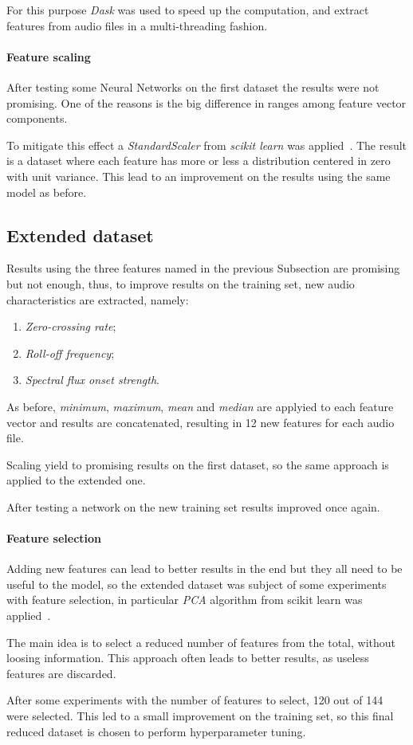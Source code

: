 For this purpose \emph{Dask} was used to speed up the computation, and 
extract features from audio files in a multi-threading fashion.~\cite{dask}

\paragraph{Feature scaling}
After testing some Neural Networks on the first dataset the results 
were not promising. One of the reasons is the big difference in 
ranges among feature vector components.

To mitigate this effect a \emph{StandardScaler} from \emph{scikit learn} was applied~\cite{scaler}.
The result is a dataset where each feature has more or less a distribution 
centered in zero with unit variance.
This lead to an improvement on the results using the same
model as before. 

\subsection{Extended dataset}
\label{extended-dataset}

Results using the three features named in the previous Subsection 
are promising but not enough, thus, to improve results on the training set, 
new audio characteristics are extracted, namely: 
\begin{enumerate}
    \item \emph{Zero-crossing rate};
    \item \emph{Roll-off frequency};
    \item \emph{Spectral flux onset strength}.
\end{enumerate}
As before, \emph{minimum}, \emph{maximum}, \emph{mean} 
and \emph{median} are applyied to each feature vector and 
results are concatenated, resulting in 12 new features for each 
audio file.

Scaling yield to promising results on the first dataset, 
so the same approach is applied to the extended one.

After testing a network on the new training set 
results improved once again.

\paragraph{Feature selection}
Adding new features can lead to better results 
in the end but they all need to be useful to the model, so 
the extended dataset was subject of some experiments with feature selection, 
in particular \emph{PCA} algorithm from scikit learn was applied~\cite{pca}.

The main idea is to select a reduced number of features from the total, 
without loosing information. This approach often leads to better results, 
as useless features are discarded.

After some experiments with the number of features to select, 120 out of 144
 were selected. This led to a small improvement on the training set, 
so this final reduced dataset is chosen to perform hyperparameter tuning.

\newpage